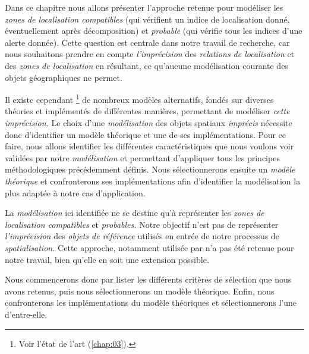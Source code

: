 Dans ce chapitre nous allons présenter l'approche retenue pour
modéliser les \emph{zones de localisation compatibles} (\ie qui
vérifient un indice de localisation donné, éventuellement après
décomposition) et \emph{probable} (qui vérifie tous les indices d'une
alerte donnée). Cette question est centrale dans notre travail de
recherche, car nous souhaitons prendre en compte \emph{l'imprécision}
des \emph{relations de localisation} et des \emph{zones de
  localisation} en résultant, ce qu'aucune modélisation courante des
objets géographiques ne permet.

Il existe cependant \footnote{Voir l'état de l'art
  (\autoref{chap:03}).} de nombreux modèles alternatifs, fondés sur
diverses théories et implémentés de différentes manières, permettant
de modéliser \emph{cette imprécision.} Le choix d'une
\emph{modélisation} des objets spatiaux \emph{imprécis} nécessite donc
d'identifier un modèle théorique et une de ses implémentations. Pour
ce faire, nous allons identifier les différentes caractéristiques que
nous voulons voir validées par notre \emph{modélisation} et permettant
d'appliquer tous les principes méthodologiques précédemment
définis. Nous sélectionnerons ensuite un \emph{modèle théorique} et
confronterons ses implémentations afin d'identifier la modélisation la
plus adaptée à notre cas d’application.

La \emph{modélisation} ici identifiée ne se destine qu'à représenter
les \emph{zones de localisation compatibles} et \emph{probables.}
Notre objectif n'est pas de représenter \emph{l'imprécision} des
\emph{objets de référence} utilisés en entrée de notre processus de
\emph{spatialisation.} Cette approche, notamment utilisée par
\textcite{Bloch1996} n'a pas été retenue pour notre travail, bien
qu'elle en soit une extension possible.

Nous commencerons donc par lister les différents critères de sélection
que nous avons retenus, puis nous sélectionnerons un modèle
théorique. Enfin, nous confronterons les implémentations du modèle
théoriques et sélectionnerons l'une d'entre-elle.

